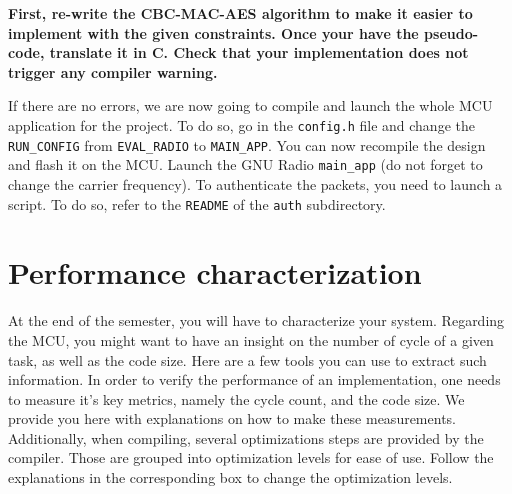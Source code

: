 \textbf{
    First, re-write the CBC-MAC-AES algorithm to make it easier to
    implement with the given constraints. Once your have the pseudo-code, translate it in C. Check that your implementation does not trigger any compiler warning.
}

If there are no errors, we are now going to compile and launch the whole MCU application for the project. To do so, go in the \texttt{config.h} file and change the \texttt{RUN\_CONFIG} from \texttt{EVAL\_RADIO} to \texttt{MAIN\_APP}. You can now recompile the design and flash it on the MCU. Launch the GNU Radio \texttt{main\_app} (do not forget to change the carrier frequency). To authenticate the packets, you need to launch a script. To do so, refer to the \texttt{README} of the \texttt{auth} subdirectory.

\section{Performance characterization}
At the end of the semester, you will have to characterize your system. Regarding the MCU, you might want to have an insight on the number of cycle of a given task, as well as the code size. Here are a few tools you can use to extract such information. In order to verify the performance of an implementation, one needs to measure it's key metrics, namely the cycle count, and the code size. We provide you here with explanations on how to make these measurements. Additionally, when compiling, several optimizations steps are provided by the compiler. Those are grouped into optimization levels for ease of use. Follow the explanations in the corresponding box to change the optimization levels.


